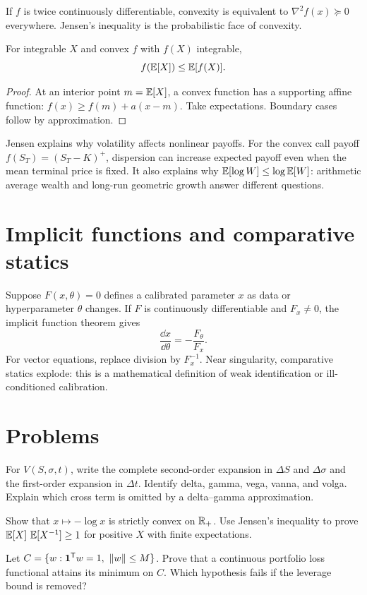 If $f$ is twice continuously differentiable, convexity is equivalent to
$\nabla^2f(x)\succeq0$ everywhere. Jensen's inequality is the probabilistic face of
convexity.

\begin{theorem}
For integrable $X$ and convex $f$ with $f(X)$ integrable,
\[
f(\operatorname{\mathbb E}[X])\leq\operatorname{\mathbb E}[f(X)].
\]
\end{theorem}
\begin{proof}
At an interior point $m=\operatorname{\mathbb E}[X]$, a convex function has a supporting affine function:
$f(x)\geq f(m)+a(x-m)$. Take expectations. Boundary cases follow by approximation.
\end{proof}

Jensen explains why volatility affects nonlinear payoffs. For the convex call payoff
$f(S_T)=(S_T-K)^+$, dispersion can increase expected payoff even when the mean
terminal price is fixed. It also explains why $\operatorname{\mathbb E}[\log W]\leq\log\operatorname{\mathbb E}[W]$: arithmetic
average wealth and long-run geometric growth answer different questions.

\section{Implicit functions and comparative statics}

Suppose $F(x,\theta)=0$ defines a calibrated parameter $x$ as data or hyperparameter
$\theta$ changes. If $F$ is continuously differentiable and $F_x\neq0$, the implicit
function theorem gives
\[
\frac{\dd x}{\dd\theta}=-\frac{F_\theta}{F_x}.
\]
For vector equations, replace division by $F_x^{-1}$. Near singularity, comparative
statics explode: this is a mathematical definition of weak identification or
ill-conditioned calibration.

\section{Problems}

\begin{exercise}
For $V(S,\sigma,t)$, write the complete second-order expansion in $\Delta S$ and
$\Delta\sigma$ and the first-order expansion in $\Delta t$. Identify delta, gamma,
vega, vanna, and volga. Explain which cross term is omitted by a delta--gamma
approximation.
\end{exercise}
\begin{exercise}
Show that $x\mapsto-\log x$ is strictly convex on $\mathbb R_{+}$. Use Jensen's inequality
to prove $\operatorname{\mathbb E}[X]\,\operatorname{\mathbb E}[X^{-1}]\geq1$ for positive $X$ with finite expectations.
\end{exercise}
\begin{exercise}
Let $C=\{w:\ones^\transpose w=1,\ \norm{w}\leq M\}$. Prove that a continuous
portfolio loss functional attains its minimum on $C$. Which hypothesis fails if the
leverage bound is removed?
\end{exercise}


